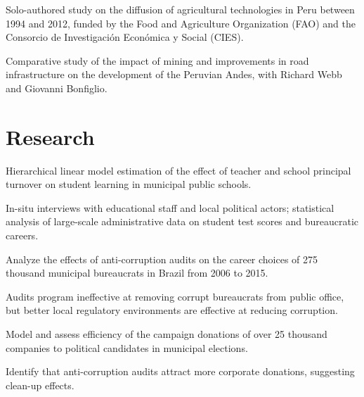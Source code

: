 \documentclass[]{deedy-resume-openfont}
\begin{document}
\begin{tightemize}
\item Solo-authored study on the diffusion of agricultural technologies in Peru between 1994 and 2012, funded by the Food and Agriculture Organization (FAO) and the Consorcio de Investigación Económica y Social (CIES).
\item Comparative study of the impact of mining and improvements in road infrastructure on the development of the Peruvian Andes, with Richard Webb and Giovanni Bonfiglio.
\end{tightemize}
\sectionsep


\section{Research}
\begin{tightemize}
    \item Hierarchical linear model estimation of the effect of teacher and school principal turnover on student learning in municipal public schools.
    \item In-situ interviews with educational staff and local political actors; statistical analysis of large-scale administrative data on student test scores and bureaucratic careers. 
\end{tightemize}
\sectionsep

\begin{tightemize}
    \item Analyze the effects of anti-corruption audits on the career choices of 275 thousand municipal bureaucrats in Brazil from 2006 to 2015.
    \item Audits program ineffective at removing corrupt bureaucrats from public office, but better local regulatory environments are effective at reducing corruption.
\end{tightemize}
\sectionsep

\begin{tightemize}
    \item Model and assess efficiency of the campaign donations of over 25 thousand companies to political candidates in municipal elections.
    \item Identify that anti-corruption audits attract more corporate donations, suggesting clean-up effects.
\end{tightemize}
\end{document}

